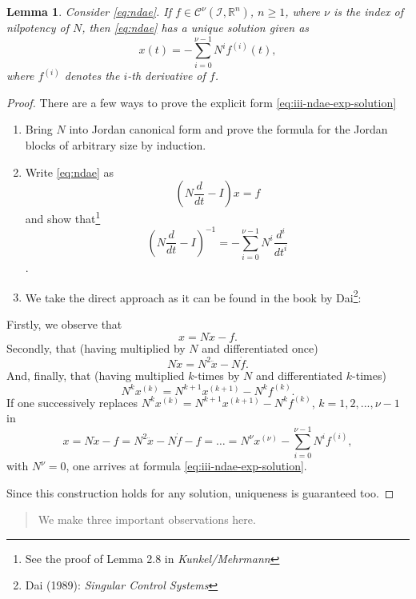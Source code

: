 \documentclass[]{book}
\newenvironment {JHSAYS} [0] {\begin{quote}\color{jhsc}} {\end{quote}}
\newtheorem{lemma}{Lemma}[chapter]
\theoremstyle{definition}
\theoremstyle{definition}
\theoremstyle{definition}
\theoremstyle{definition}
\theoremstyle{remark}
\begin{document}
\begin{lemma}
\protect\hypertarget{lem:ndae-explicit-solution}{}{\label{lem:ndae-explicit-solution} }Consider \eqref{eq:ndae}. If \(f \in \mathcal C^\nu(\mathcal I, \mathbb R^{n})\), \(n\geq 1\), where \(\nu\) is the index of nilpotency of \(N\), then \eqref{eq:ndae} has a unique solution given as
\begin{equation}
x(t) = - \sum_{i=0}^{\nu-1}N^if^{(i)}(t), \label{eq:iii-ndae-exp-solution}
\end{equation}
where \(f^{(i)}\) denotes the \(i\)-th derivative of \(f\).
\end{lemma}

\begin{proof}
{}There are a few ways to prove the explicit form \eqref{eq:iii-ndae-exp-solution}

\begin{enumerate}
\def\labelenumi{\arabic{enumi}.}
\item
  Bring \(N\) into Jordan canonical form and prove the formula for the Jordan blocks of arbitrary size by induction.
\item
  Write \eqref{eq:ndae} as \[(N\frac{d}{dt}-I)x = f\] and show that\footnote{See the proof of Lemma 2.8 in \emph{Kunkel/Mehrmann}} \[(N\frac{d}{dt}-I)^{-1} = - \sum_{i=0}^{\nu-1}N^i\frac{d^i}{dt^i}\].
\item
  We take the direct approach as it can be found in the book by Dai\footnote{Dai (1989): \emph{Singular Control Systems}}:
\end{enumerate}

Firstly, we observe that
\[
x = N\dot x - f.
\]
Secondly, that (having multiplied by \(N\) and differentiated once)
\[
N\dot x = N^2 \ddot x - N \dot f.
\]
And, finally, that (having multiplied \(k\)-times by \(N\) and differentiated \(k\)-times)
\[
N^k x^{(k)} = N^{k+1} x^{(k+1)} - N^k f^{(k)}.
\]
If one successively replaces \(N^kx^{(k)}=N^{k+1}x^{(k+1)}-N^kf^{(k)}\), \(k=1,2,...,\nu-1\) in
\[
x=N\dot x -f = N^2\ddot x - N\dot f -f = \dots = N^\nu x^{(\nu)} - \sum_{i=0}^{\nu-1} N^if^{(i)},
\]
with \(N^\nu=0\), one arrives at formula \eqref{eq:iii-ndae-exp-solution}.

Since this construction holds for any solution, uniqueness is guaranteed too.
\end{proof}

\begin{JHSAYS}
We make three important observations here.
\end{JHSAYS}
\end{document}
